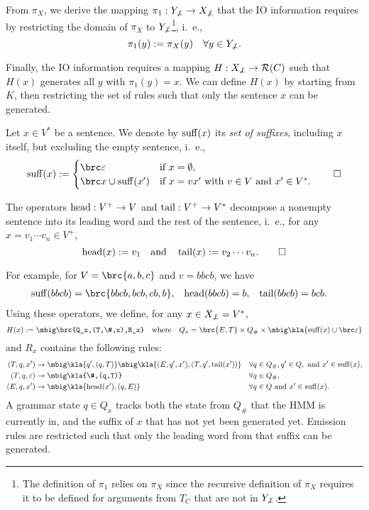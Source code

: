 From $\pi_X$, we derive the mapping $\pi_1: Y_{\not\bot} \to X_{\not\bot}$ that
the IO information requires by restricting the domain of $\pi_X$ to
$Y_{\not\bot}$\footnote{The definition of $\pi_1$ relies on $\pi_X$ since the
recursive definition of $\pi_X$ requires it to be defined for arguments from
$T_C$ that are not in $Y_{\not\bot}$.}, i.~e.,
\[
 \pi_1(y) := \pi_X(y) \quad\forall y\in Y_{\not\bot}.
\]

Finally, the IO information requires a mapping $H: X_{\not\bot}\to\mathcal R(C)$ such
that $H(x)$ generates all $y$ with $\pi_1(y)=x$. We can define $H(x)$ by
starting from $K$, then restricting the set of rules such that only the
sentence $x$ can be generated.

\begin{definition}
 Let $x\in V^*$ be a sentence. We denote by $\operatorname{suff}(x)$ its
 \emph{set of suffixes}, including $x$ itself, but excluding the empty sentence, i.~e.,
 \[
  \suff(x) := \begin{cases}
   \brc\eps & \text{if } x = \emptyset, \\
   \brc x \cup \suff(x') & \text{if } x = vx' \text{ with } v\in V\text{ and }x'\in V^*.
  \end{cases}\qedhere
 \]
\end{definition}

\begin{definition}
 The operators $\operatorname{head}:V^+\to V$ and $\operatorname{tail}:V^+\to V^*$ decompose a nonempty sentence into its leading word and the rest of the sentence, i.~e., for any $x = v_1\cdots v_n\in V^+$,
 \[
  \operatorname{head}(x) := v_1
  \quad\text{and}\quad
  \operatorname{tail}(x) := v_2\cdots v_n.
  \qedhere
 \]
\end{definition}

For example, for $V = \brc{a,b,c}$ and $v = bbcb$, we have
\begin{align*}
 \suff(bbcb) &= \brc{bbcb, bcb, cb, b}, &
 \car(bbcb) &= b, &
 \cdr(bbcb) &= bcb.
\end{align*}
Using these operators, we define, for any $x\in X_{\not\bot} = V^*$,
\[
 H(x) := \mbig\brc{Q_x,(T,\#,x),R_x} \quad\text{where}\quad Q_x = \brc{E,T} \times Q_\# \times \mbig\kla{\suff(x)\cup\brc\eps}
\]
and $R_x$ contains the following rules:
\begin{align*}\label{03-h-rules}
 (T,q,x') &\to \mbig\kla{q',(q,T)}\mbig\kla{(E,q',x'),(T,q',\cdr(x'))} && \forall q\in Q_\#,q'\in Q,\text{ and }x'\in\suff(x), \\
 (T,q,\eps) &\to \mbig\kla{\#,(q,T)} && \forall q\in Q_\#, \\
 (E,q,x') &\to \mbig\kla{\car(x'),(q,E)} && \forall q\in Q\text{ and }x'\in\suff(x).
\end{align*}
%
A grammar state $q\in Q_x$ tracks both the state from $Q_\#$ that the HMM is
currently in, and the suffix of $x$ that has not yet been generated yet. Emission
rules are restricted such that only the leading word from that suffix can be generated.

